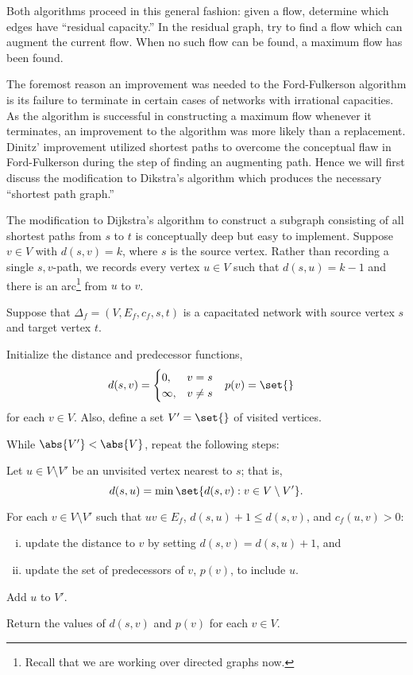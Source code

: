 \documentclass[m3380-lec-main.tex]{subfiles}
\begin{document}
Both algorithms proceed in this general fashion: given a flow, determine which edges have ``residual capacity.'' In the residual graph, try to find a flow which can augment the current flow. When no such flow can be found, a maximum flow has been found.

The foremost reason an improvement was needed to the Ford-Fulkerson algorithm is its failure to terminate in certain cases of networks with irrational capacities. As the algorithm is successful in constructing a maximum flow whenever it terminates, an improvement to the algorithm was more likely than a replacement. Dinitz' improvement utilized shortest paths to overcome the conceptual flaw in Ford-Fulkerson during the step of finding an augmenting path. Hence we will first discuss the modification to Dikstra's algorithm which produces the necessary ``shortest path graph.''

The modification to Dijkstra's algorithm to construct a subgraph consisting of all shortest paths from $s$ to $t$ is conceptually deep but easy to implement. Suppose $v\in V$ with $d(s,v)=k$, where $s$ is the source vertex. Rather than recording a single $s,v$-path, we records every vertex $u\in V$ such that $d(s,u)=k-1$ and there is an arc\footnote{Recall that we are working over directed graphs now.} from $u$ to $v$.

\begin{alg}\label{alg:mod_dijkstra} Suppose that $\Delta_f=(V,E_f,c_f,s,t)$ is a capacitated network with source vertex $s$ and target vertex $t$.
\begin{enum}
\item Initialize the distance and predecessor functions,
\begin{align*}
d(s,v) &= \begin{cases} 0, & v=s \\ \infty, &v\neq s \end{cases} 
&
p(v) &= \set{}
\end{align*}
for each $v\in V$. Also, define a set $V'=\set{}$ of visited vertices.
\item While $\abs{V'}<\abs{V}$, repeat the following steps:
\begin{enuma}
\item Let $u\in V\setminus V'$ be an unvisited vertex nearest to $s$; that is, \[d(s,u)=\min\set{d(s,v):v\in V\setminus V'}.\]
\item For each $v\in V\setminus V'$ such that $uv\in E_f$, $d(s,u)+1\leq d(s,v)$, and $c_f(u,v)>0$:
\begin{enumerate}[i.~]
\item update the distance to $v$ by setting $d(s,v)=d(s,u)+1$, and
\item update the set of predecessors of $v$, $p(v)$, to include $u$.
\end{enumerate} 
\item Add $u$ to $V'$.
\end{enuma}
\item Return the values of $d(s,v)$ and $p(v)$ for each $v\in V$.
\end{enum}
\end{alg}
\end{document}
